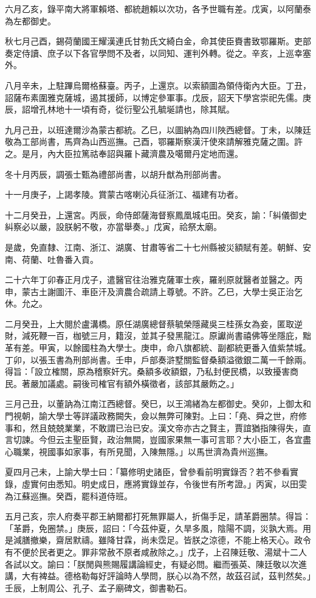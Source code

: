 \begin{pinyinscope}
六月乙亥，錄平南大將軍賴塔、都統趙賴以次功，各予世職有差。戊寅，以阿蘭泰為左都御史。

秋七月己酉，錫荷蘭國王耀漢連氏甘勃氏文綺白金，命其使臣賚書致鄂羅斯。吏部奏定侍讀、庶子以下各官學問不及者，以同知、運判外轉。從之。辛亥，上巡幸塞外。

八月辛未，上駐蹕烏爾格蘇臺。丙子，上還京。以索額圖為領侍衛內大臣。丁丑，詔薩布素圍雅克薩城，遏其援師，以博定參軍事。戊辰，詔天下學宮崇祀先儒。庚辰，詔增孔林地十一頃有奇，從衍聖公孔毓埏請也，除其賦。

九月己丑，以班達爾沙為蒙古都統。乙巳，以圖納為四川陜西總督。丁未，以陳廷敬為工部尚書，馬齊為山西巡撫。己酉，鄂羅斯察漢汗使來請解雅克薩之圍。許之。是月，內大臣拉篤祜奉詔與羅卜藏濟農及噶爾丹定地而還。

冬十月丙辰，調張士甄為禮部尚書，以胡升猷為刑部尚書。

十一月庚子，上謁孝陵。賞蒙古喀喇沁兵征浙江、福建有功者。

十二月癸丑，上還宮。丙辰，命侍郎薩海督察鳳凰城屯田。癸亥，諭：「糾儀御史糾察必以嚴，設朕躬不敬，亦當舉奏。」戊寅，祫祭太廟。

是歲，免直隸、江南、浙江、湖廣、甘肅等省二十七州縣被災額賦有差。朝鮮、安南、荷蘭、吐魯番入貢。

二十六年丁卯春正月戊子，遣醫官往治雅克薩軍士疾，羅剎原就醫者並醫之。丙申，蒙古土謝圖汗、車臣汗及濟農合疏請上尊號。不許。乙巳，大學士吳正治乞休。允之。

二月癸丑，上大閱於盧溝橋。原任湖廣總督蔡毓榮隱藏吳三桂孫女為妾，匿取逆財，減死鞭一百，枷號三月，籍沒，並其子發黑龍江。原讞尚書禧佛等坐隱庇，黜革有差。甲寅，以餘國柱為大學士。庚申，命八旗都統、副都統更番入值紫禁城。丁卯，以張玉書為刑部尚書。壬申，戶部奏滸墅關監督桑額溢徵銀二萬一千餘兩。得旨：「設立榷關，原為稽察奸宄。桑額多收額銀，乃私封便民橋，以致擾害商民。著嚴加議處。嗣後司榷官有額外橫徵者，該部其嚴飭之。」

三月己丑，以董訥為江南江西總督。癸巳，以王鴻緒為左都御史。癸卯，上御太和門視朝，諭大學士等詳議政務闕失，僉以無弊可陳對。上曰：「堯、舜之世，府修事和，然且兢兢業業，不敢謂已治已安。漢文帝亦古之賢主，賈誼猶指陳得失，直言切諫。今但云主聖臣賢，政治無闕，豈國家果無一事可言耶？大小臣工，各宜盡心職業，視國事如家事，有所見聞，入陳無隱。」以馬世濟為貴州巡撫。

夏四月己未，上諭大學士曰：「纂修明史諸臣，曾參看前明實錄否？若不參看實錄，虛實何由悉知。明史成日，應將實錄並存，令後世有所考證。」丙寅，以田雯為江蘇巡撫。癸酉，罷科道侍班。

五月己亥，宗人府奏平郡王納爾都打死無罪屬人，折傷手足，請革爵圈禁。得旨：「革爵，免圈禁。」庚辰，詔曰：「今茲仲夏，久旱多風，陰陽不調，災孰大焉。用是減膳撤樂，齋居默禱。雖降甘霖，尚未霑足。皆朕之涼德，不能上格天心。政令有不便於民者更之。罪非常赦不原者咸赦除之。」戊子，上召陳廷敬、湯斌十二人各試以文。諭曰：「朕閒與熊賜履講論經史，有疑必問。繼而張英、陳廷敬以次進講，大有裨益。德格勒每好評論時人學問，朕心以為不然，故茲召試，茲判然矣。」壬辰，上制周公、孔子、孟子廟碑文，御書勒石。


\end{pinyinscope}
